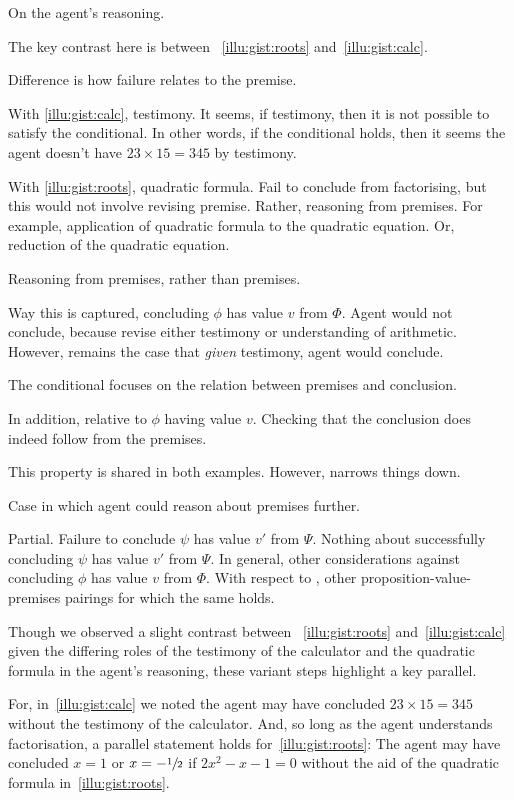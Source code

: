 \begin{note}
  On the agent's reasoning.

  The key contrast here is between ~\ref{illu:gist:roots} and~\ref{illu:gist:calc}.

  Difference is how failure relates to the premise.

  With \autoref{illu:gist:calc}, testimony.
  It seems, if testimony, then it is not possible to satisfy the conditional.
  In other words, if the conditional holds, then it seems the agent doesn't have \(23 \times 15 = 345\) by testimony.

  With \autoref{illu:gist:roots}, quadratic formula.
  Fail to conclude from factorising, but this would not involve revising premise.
  Rather, reasoning from premises.
  For example, application of quadratic formula to the quadratic equation.
  Or, reduction of the quadratic equation.

  Reasoning from premises, rather than premises.

  Way this is captured, concluding \(\phi\) has value \(v\) from \(\Phi\).
  Agent would not conclude, because revise either testimony or understanding of arithmetic.
  However, remains the case that \emph{given} testimony, agent would conclude.

  The conditional focuses on the relation between premises and conclusion.
\end{note}

\begin{note}
  In addition, relative to \(\phi\) having value \(v\).
  Checking that the conclusion does indeed follow from the premises.

  This property is shared in both examples.
  However, narrows things down.

  Case in which agent could reason about premises further.
\end{note}

\begin{note}
  Partial.
  Failure to conclude \(\psi\) has value \(v'\) from \(\Psi\).
  Nothing about successfully concluding \(\psi\) has value \(v'\) from \(\Psi\).
  In general, other considerations against concluding \(\phi\) has value \(v\) from \(\Phi\).
  With respect to , other proposition-value-premises pairings for which the same holds.
\end{note}

\begin{note}
  \color{red}
  Though we observed a slight contrast between ~\ref{illu:gist:roots} and~\ref{illu:gist:calc} given the differing roles of the testimony of the calculator and the quadratic formula in the agent's reasoning, these variant steps highlight a key parallel.

  For, in~\autoref{illu:gist:calc} we noted the agent may have concluded \(23 \times 15 = 345\) without the testimony of the calculator.
  And, so long as the agent understands factorisation, a parallel statement holds for~\ref{illu:gist:roots}:
  The agent may have concluded \(x = 1\) or \(x = -\sfrac{1}{2}\) if \(2x^{2} - x - 1 = 0\) without the aid of the quadratic formula in~\autoref{illu:gist:roots}.
\end{note}

